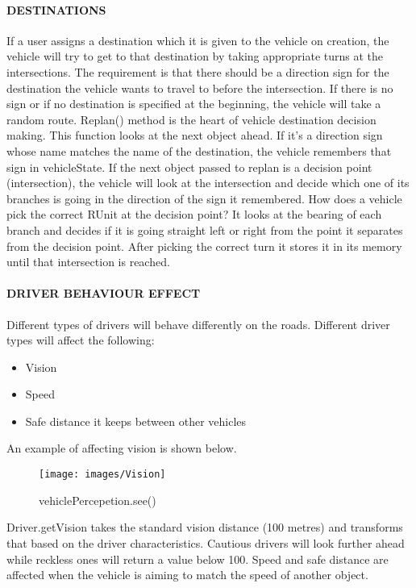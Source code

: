 \documentclass[11pt,a4paper]{article}
\begin{document}
  	
  	\paragraph{DESTINATIONS}
  	
  	If a user assigns a destination which it is given to the vehicle on creation, the vehicle will try to get to that destination by taking appropriate turns at the intersections. The requirement is that there should be a direction sign for the destination the vehicle wants to travel to before the intersection. If there is no sign or if no destination is specified at the beginning, the vehicle will take a random route.
Replan() method is the heart of vehicle destination decision making. This function looks at the next object ahead. If it’s a direction sign whose name matches the name of the destination, the vehicle remembers that sign in vehicleState. If the next object passed to replan is a decision point (intersection), the vehicle will look at the intersection and decide which one of its branches is going in the direction of the sign it remembered. 
How does a vehicle pick the correct RUnit at the decision point? It looks at the bearing of each branch and decides if it is going straight left or right from the point it separates from the decision point. After picking the correct turn it stores it in its memory until that intersection is reached.

  	\paragraph{DRIVER BEHAVIOUR EFFECT}
  
  Different types of drivers will behave differently on the roads. Different driver types will affect the following:
  
  \begin{itemize}
  	\item Vision
  	\item Speed
  	\item Safe distance it keeps between other vehicles
  \end{itemize}
  
  An example of affecting vision is shown below.  
  
  \begin{figure}[h!]
			\texttt{[image: images/Vision]}
			\caption{vehiclePercepetion.see()}
			\centering
		\end{figure} 

Driver.getVision takes the standard vision distance (100 metres) and transforms that based on the driver characteristics. Cautious drivers will look further ahead while reckless ones will return a value below 100.
Speed and safe distance are affected when the vehicle is aiming to match the speed of another object.
	
\end{document}

